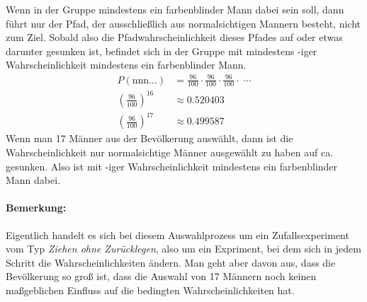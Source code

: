 \begin{exercise}
\begin{center}
    \end{center}
    Wenn in der Gruppe mindestens ein farbenblinder
    Mann dabei sein soll, dann führt nur der Pfad,
    der ausschließlich aus normalsichtigen Mannern
    besteht, nicht zum Ziel.
    Sobald also die Pfadwahrscheinlichkeit dieses Pfades
    auf  oder etwas darunter gesunken ist,
    befindet sich in der Gruppe mit mindestens
    -iger Wahrscheinlichkeit mindestens ein
    farbenblinder Mann.
    \begin{equation*}
      \begin{split}
        P(\text{nnn}\ldots)&=\frac{96}{100}\cdot\frac{96}{100}\cdot\frac{96}{100}\cdot\;\cdots
        \\[1ex]
        \left(\frac{96}{100}\right)^{16}&\approx\num{0.520403}
        \\[1ex]
        \left(\frac{96}{100}\right)^{17}&\approx\num{0.499587}
      \end{split}
    \end{equation*}
    Wenn man 17 Männer aus der Bevölkerung auswählt,
    dann ist die Wahrscheinlichkeit nur normalsichtige
    Männer ausgewählt zu haben auf ca.  gesunken.
    Also ist mit -iger Wahrscheinlichkeit
    mindestens ein farbenblinder Mann dabei.
    \paragraph{Bemerkung:}
    Eigentlich handelt es sich bei diesem
    Auswahlprozess um ein Zufallsexperiment vom Typ
    \emph{Ziehen ohne Zurücklegen}, also um ein
    Expriment, bei dem sich in jedem Schritt die
    Wahrscheinlichkeiten ändern.
    Man geht aber davon aus, dass die Bevölkerung
    so groß ist, dass die Auswahl von 17 Männern
    noch keinen maßgeblichen Einfluss auf die
    bedingten Wahrscheinlichkeiten hat.
  \fi
\end{exercise}
